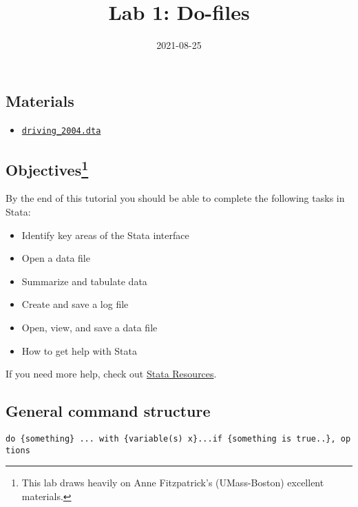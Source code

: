 \documentclass[
]{article}
\title{Lab 1: Do-files}
\author{}
\date{2021-08-25}
\providecommand{\tightlist}{%
  \setlength{\itemsep}{0pt}\setlength{\parskip}{0pt}}
\begin{document}
\maketitle

{
\setcounter{tocdepth}{3}
\tableofcontents
}
\hypertarget{materials}{%
\subsection*{Materials}\label{materials}}

\begin{itemize}
\tightlist
\item
  \href{../materials/driving_2004.dta}{\texttt{driving\_2004.dta}}
\end{itemize}

\hypertarget{objectives}{%
\subsection*{\texorpdfstring{Objectives\footnote{This lab draws heavily
  on Anne Fitzpatrick's (UMass-Boston) excellent materials.}}{Objectives}}\label{objectives}}

By the end of this tutorial you should be able to complete the following
tasks in Stata:

\begin{itemize}
\item
  Identify key areas of the Stata interface
\item
  Open a data file
\item
  Summarize and tabulate data
\item
  Create and save a log file
\item
  Open, view, and save a data file
\item
  How to get help with Stata
\end{itemize}

If you need more help, check out \href{/bonus/stata-resources}{Stata
Resources}.

\hypertarget{general-command-structure}{%
\subsection{General command structure}\label{general-command-structure}}

\texttt{do\ \{something\}\ ...\ with\ \{variable(s)\ x\}...if\ \{something\ is\ true..\},\ options}
\end{document}
